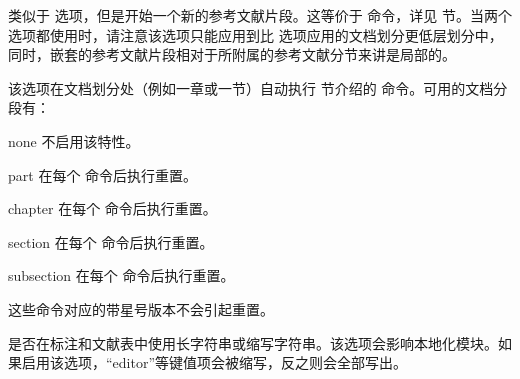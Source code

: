\begin{optionlist}

类似于  选项，但是开始一个新的参考文献片段。这等价于  命令，详见  节。当两个选项都使用时，请注意该选项只能应用到比  选项应用的文档划分更低层划分中，同时，嵌套的参考文献片段相对于所附属的参考文献分节来讲是局部的。



该选项在文档划分处（例如一章或一节）自动执行  节介绍的  命令。可用的文档分段有：

\begin{valuelist}
\item[none] %
不启用该特性。
\item[part] %
在每个   命令后执行重置。
\item[chapter] %
在每个   命令后执行重置。
\item[section] %
在每个   命令后执行重置。
\item[subsection] %
在每个   命令后执行重置。
\end{valuelist}
%
这些命令对应的带星号版本不会引起重置。


是否在标注和文献表中使用长字符串或缩写字符串。该选项会影响本地化模块。如果启用该选项，“editor”等键值项会被缩写，反之则会全部写出。


\end{optionlist}
